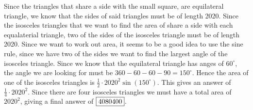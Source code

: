 \begin{solution}\hfil\medskip
Since the triangles that share a side with the small square, are equilateral triangle, we know that the sides of said triangles must be of length 2020. Since the isosceles triangles that we want to find the area of share a side with each equalaterial triangle, two of the sides of the isosceles triangle must be of length 2020. Since we want to work out area, it seems to be a good idea to use the sine rule, since we have two of the sides we want to find the largest angle of the isosceles triangle. Since we know that the equilateral triangle has anges of \(60^{\circ}\), the angle we are looking for must be \(360-60-60-90=150^{\circ}\). Hence the area of one of the isosceles triangles is \(\frac{1}{2}\cdot 2020^2\sin(150^{\circ})\). This gives an answer of \(\frac{1}{4}\cdot2020^2\). Since there are four isosceles triangles we must have a total area of \(2020^2\), giving a final answer of \(\fbox{4080400}\).
\end{solution}\bigskip

